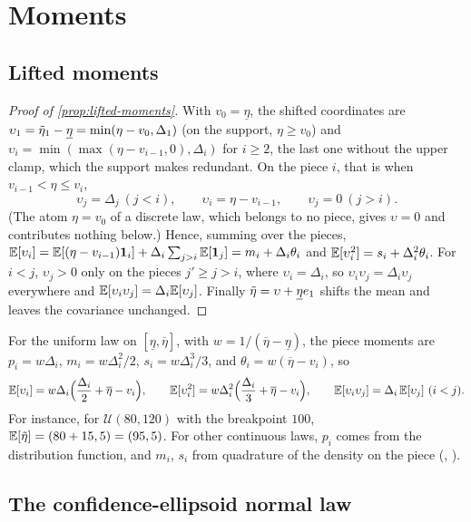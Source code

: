 \section{Moments}
\label{app:moments}

\subsection{Lifted moments}

\begin{proof}[Proof of \cref{prop:lifted-moments}]
With $v_0 = \underline\eta$, the shifted coordinates are $\upsilon_1 = \tilde\eta_1 - \underline\eta = \min(\eta - v_0, \Delta_1)$ (on the support, $\eta \ge v_0$)
and $\upsilon_i = \min(\max(\eta - v_{i-1}, 0), \Delta_i)$ for $i \ge 2$, the last one without the upper clamp, which the support makes redundant.
On the piece $i$, that is when $v_{i-1} < \eta \le v_i$,
\[
\upsilon_j = \Delta_j \ (j < i), \qquad \upsilon_i = \eta - v_{i-1}, \qquad \upsilon_j = 0 \ (j > i).
\]
(The atom $\eta = v_0$ of a discrete law, which belongs to no piece, gives $\upsilon = 0$ and contributes nothing below.)
Hence, summing over the pieces,
$\mathbb{E}[\upsilon_i] = \mathbb{E}[(\eta - v_{i-1})\mathbf{1}_i] + \Delta_i\sum_{j > i}\mathbb{E}[\mathbf{1}_j] = m_i + \Delta_i\theta_i$
and $\mathbb{E}[\upsilon_i^2] = s_i + \Delta_i^2\theta_i$.
For $i < j$, $\upsilon_j > 0$ only on the pieces $j' \ge j > i$, where $\upsilon_i = \Delta_i$,
so $\upsilon_i\upsilon_j = \Delta_i\upsilon_j$ everywhere and $\mathbb{E}[\upsilon_i\upsilon_j] = \Delta_i\mathbb{E}[\upsilon_j]$.
Finally $\tilde\eta = \upsilon + \underline\eta e_1$ shifts the mean and leaves the covariance unchanged.
\end{proof}

For the uniform law on $[\underline\eta, \overline\eta]$, with $w = 1/(\overline\eta - \underline\eta)$,
the piece moments are $p_i = w\Delta_i$, $m_i = w\Delta_i^2/2$, $s_i = w\Delta_i^3/3$,
and $\theta_i = w(\overline\eta - v_i)$, so
\[
\mathbb{E}[\upsilon_i] = w\Delta_i\Bigl(\frac{\Delta_i}2 + \overline\eta - v_i\Bigr),
\qquad
\mathbb{E}[\upsilon_i^2] = w\Delta_i^2\Bigl(\frac{\Delta_i}3 + \overline\eta - v_i\Bigr),
\qquad
\mathbb{E}[\upsilon_i\upsilon_j] = \Delta_i\,\mathbb{E}[\upsilon_j] \ (i < j).
\]
For instance, for $\mathcal{U}(80, 120)$ with the breakpoint $100$, $\mathbb{E}[\tilde\eta] = (80 + 15, 5) = (95, 5)$.
For other continuous laws, $p_i$ comes from the distribution function, and $m_i$, $s_i$ from quadrature of the density on the piece
(, ).

\subsection{The confidence-ellipsoid normal law}

